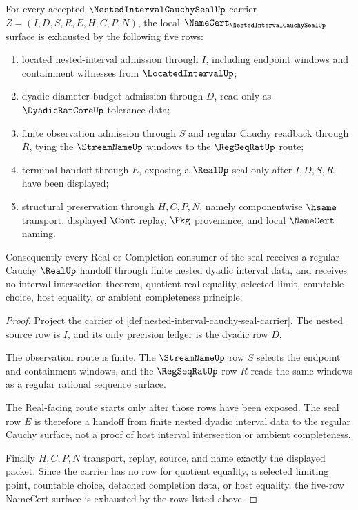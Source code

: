 \begin{theorem}
\label{thm:nested-interval-cauchy-seal-namecert-obligations}
For every accepted $\NestedIntervalCauchySealUp$ carrier $Z=(I,D,S,R,E,H,C,P,N)$, the local $\NameCert_{\NestedIntervalCauchySealUp}$ surface is exhausted by the following five rows:
\begin{enumerate}
\item located nested-interval admission through $I$, including endpoint windows and containment witnesses from $\LocatedIntervalUp$;
\item dyadic diameter-budget admission through $D$, read only as $\DyadicRatCoreUp$ tolerance data;
\item finite observation admission through $S$ and regular Cauchy readback through $R$, tying the $\StreamNameUp$ windows to the $\RegSeqRatUp$ route;
\item terminal handoff through $E$, exposing a $\RealUp$ seal only after $I,D,S,R$ have been displayed;
\item structural preservation through $H,C,P,N$, namely componentwise $\hsame$ transport, displayed $\Cont$ replay, $\Pkg$ provenance, and local $\NameCert$ naming.
\end{enumerate}
Consequently every Real or Completion consumer of the seal receives a regular Cauchy $\RealUp$ handoff through finite nested dyadic interval data, and receives no interval-intersection theorem, quotient real equality, selected limit, countable choice, host equality, or ambient completeness principle.
\end{theorem}
\begin{proof}
Project the carrier of \autoref{def:nested-interval-cauchy-seal-carrier}. The nested source row is $I$, and its only precision ledger is the dyadic row $D$.

The observation route is finite. The $\StreamNameUp$ row $S$ selects the endpoint and containment windows, and the $\RegSeqRatUp$ row $R$ reads the same windows as a regular rational sequence surface.

The Real-facing route starts only after those rows have been exposed. The seal row $E$ is therefore a handoff from finite nested dyadic interval data to the regular Cauchy surface, not a proof of host interval intersection or ambient completeness.

Finally $H,C,P,N$ transport, replay, source, and name exactly the displayed packet. Since the carrier has no row for quotient equality, a selected limiting point, countable choice, detached completion data, or host equality, the five-row NameCert surface is exhausted by the rows listed above.
\end{proof}


